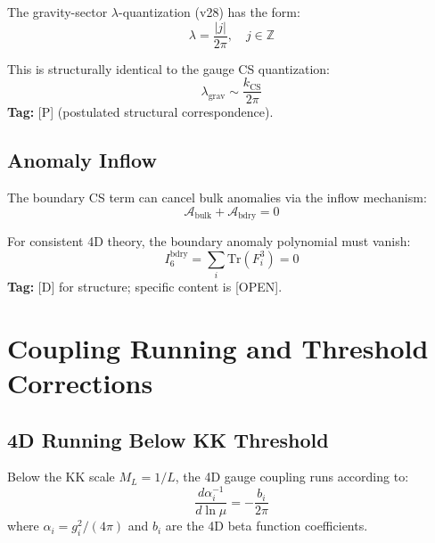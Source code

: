 \documentclass[11pt,a4paper]{article}
\begin{document}
The gravity-sector $\lambda$-quantization (v28) has the form:
\begin{equation}
  \lambda = \frac{|j|}{2\pi}, \quad j \in \mathbb{Z}
  \label{eq:lambda-quant-recall}
\end{equation}

This is structurally identical to the gauge CS quantization:
\begin{equation}
  \boxed{\lambda_{\text{grav}} \sim \frac{k_{\text{CS}}}{2\pi}}
  \label{eq:lambda-cs-analogy}
\end{equation}
\textbf{Tag:} [P] (postulated structural correspondence).

\subsection{Anomaly Inflow}

The boundary CS term can cancel bulk anomalies via the inflow mechanism:
\begin{equation}
  \mathcal{A}_{\text{bulk}} + \mathcal{A}_{\text{bdry}} = 0
  \label{eq:anomaly-cancellation}
\end{equation}

For consistent 4D theory, the boundary anomaly polynomial must vanish:
\begin{equation}
  I_6^{\text{bdry}} = \sum_i \text{Tr}(F_i^3) = 0
  \label{eq:anomaly-polynomial}
\end{equation}
\textbf{Tag:} [D] for structure; specific content is [OPEN].

\section{Coupling Running and Threshold Corrections}
\label{sec:running}

\subsection{4D Running Below KK Threshold}

Below the KK scale $M_L = 1/L$, the 4D gauge coupling runs according to:
\begin{equation}
  \frac{d\alpha_i^{-1}}{d\ln\mu} = -\frac{b_i}{2\pi}
  \label{eq:rge-4d}
\end{equation}
where $\alpha_i = g_i^2/(4\pi)$ and $b_i$ are the 4D beta function coefficients.
\end{document}
